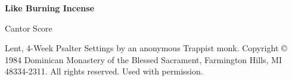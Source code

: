 \documentclass{lbi_cantor_bind}
\begin{document}
\thispagestyle{empty}
\begin{center}
    \null\vfill
    \Large\bfseries
    Like Burning Incense

    \normalfont\Large
    \vspace{2\baselineskip}Cantor Score

    \vspace{1\baselineskip}Lent, 4-Week Psalter
    \vfill\vfill\vfill
    \small
    Settings by an anonymous Trappist monk. Copyright © 1984 Dominican Monastery of the Blessed Sacrament, Farmington Hills, MI 48334-2311. All rights reserved. Used with permission.
\end{center}

\end{document}
